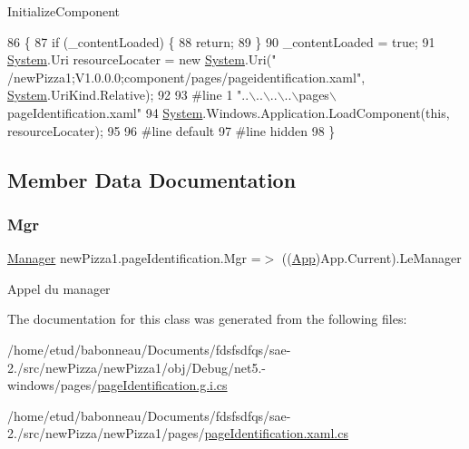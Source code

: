 Initialize\+Component 


\begin{DoxyCode}
86                                           \{
87             \textcolor{keywordflow}{if} (\_contentLoaded) \{
88                 \textcolor{keywordflow}{return};
89             \}
90             \_contentLoaded = \textcolor{keyword}{true};
91             \hyperlink{namespaceSystem}{System}.Uri resourceLocater = \textcolor{keyword}{new} \hyperlink{namespaceSystem}{System}.Uri(\textcolor{stringliteral}{"
      /newPizza1;V1.0.0.0;component/pages/pageidentification.xaml"}, \hyperlink{namespaceSystem}{System}.UriKind.Relative);
92             
93 \textcolor{preprocessor}{            #line 1 "..\(\backslash\)..\(\backslash\)..\(\backslash\)..\(\backslash\)pages\(\backslash\)pageIdentification.xaml"}
94             \hyperlink{namespaceSystem}{System}.Windows.Application.LoadComponent(\textcolor{keyword}{this}, resourceLocater);
95             
96 \textcolor{preprocessor}{            #line default}
97 \textcolor{preprocessor}{            #line hidden}
98         \}
\end{DoxyCode}


\subsection{Member Data Documentation}
\mbox{\label{classnewPizza1_1_1pageIdentification_aa9d52ac6d4d3d35b3ce1947e999a5465}} 
\subsubsection{\texorpdfstring{Mgr}{Mgr}}
{\footnotesize\ttfamily \hyperlink{classModele_1_1Manager}{Manager} new\+Pizza1.\+page\+Identification.\+Mgr =$>$ ((\hyperlink{classnewPizza1_1_1App}{App})App.\+Current).Le\+Manager}



Appel du manager 



The documentation for this class was generated from the following files\+:\begin{DoxyCompactItemize}
\item 
/home/etud/babonneau/\+Documents/fdsfsdfqs/sae-\/2./src/new\+Pizza/new\+Pizza1/obj/\+Debug/net5.-\/windows/pages/\hyperlink{net5_80-windows_2pages_2pageIdentification_8g_8i_8cs}{page\+Identification.\+g.\+i.\+cs}\item 
/home/etud/babonneau/\+Documents/fdsfsdfqs/sae-\/2./src/new\+Pizza/new\+Pizza1/pages/\hyperlink{pageIdentification_8xaml_8cs}{page\+Identification.\+xaml.\+cs}\end{DoxyCompactItemize}

